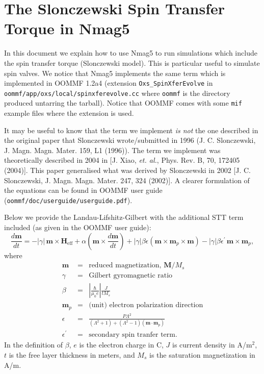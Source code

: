 \documentclass[11pt,oneside,openany]{article}
\author{Matteo Franchin}
\newcommand{\vect}[1]{\mathbf{#1}}
\newcommand{\vecs}[2]{\mathbf{#1_{\mathrm{#2}}}}
\newcommand{\vm}{\vect{m}}
\newcommand{\vM}{\vect{M}}
\begin{document}
\titlepage

\section{The Slonczewski Spin Transfer Torque in Nmag5}
In this document we explain how to use Nmag5 to run simulations which
include the spin transfer torque (Slonczewski model). This is particular
useful to simulate spin valves. We notice that Nmag5 implements the same
term which is implemented in OOMMF 1.2a4 (extension \verb|Oxs_SpinXferEvolve|
in \verb|oommf/app/oxs/local/spinxferevolve.cc| where \verb|oommf| is the
directory produced untarring the tarball). Notice that OOMMF comes with some
\verb|mif| example files where the extension is used.

It may be useful to know that the term we implement \emph{is not} the one
described in the original paper that Slonczewski wrote/submitted in 1996
(J. C. Slonczewski, J. Magn. Magn. Mater. 159, L1 (1996)).
The term we implement was theoretically described in 2004
in [J. Xiao, \emph{et. al.}, Phys. Rev. B, 70, 172405 (2004)].
This paper generalised what was derived by Slonczewski in 2002
[J. C. Slonczewski, J. Magn. Magn. Mater. 247, 324 (2002)].
A clearer formulation of the equations can be found in OOMMF user guide
(\verb|oommf/doc/userguide/userguide.pdf|).

Below we provide the Landau-Lifshitz-Gilbert with the additional STT term
included (as given in the OOMMF user guide):
\begin{equation}
  \frac{d\vm}{dt} = -|\gamma|\,\vm\times\vecs{H}{eff}
   + \alpha
     \left(\vm\times\frac{d\vm}{dt}\right)
   + |\gamma|\beta\epsilon
     \left(\vm\times\vm_p\times\vm\right)
   - |\gamma|\beta\epsilon^\prime\,\vm\times\vm_p,
\label{eq:oxsllgspinxfer}
\end{equation}
where
\begin{eqnarray*}
\vm & = & \mbox{reduced magnetization, $\vM/M_s$} \\
\gamma & = & \mbox{Gilbert gyromagnetic ratio} \\
\beta & = & \left|\frac{\hbar}{\mu_0 e}\right|\frac{J}{t M_s} \\
\vm_p & = & \mbox{(unit) electron polarization direction} \\
\epsilon & = &
\frac{P\Lambda^2}{(\Lambda^2+1)+(\Lambda^2-1)(\vm\cdot\vm_p)} \\
\epsilon^\prime & = & \mbox{secondary spin tranfer term}.
\end{eqnarray*}
In the definition of $\beta$, $e$ is the electron charge in C, $J$ is
current density in A/m${}^2$, $t$ is the free layer thickness in meters,
and $M_s$ is the saturation magnetization in A/m.
\end{document}
